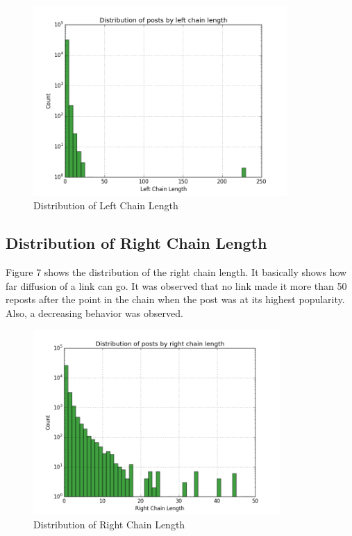 \documentclass{article} %
\begin{document}
\begin{figure}[h]
\begin{center}
\includegraphics[width=3.8in]{left_chain.png}
\caption{Distribution of Left Chain Length}
\end{center}
\end{figure}

\subsection{Distribution of Right Chain Length}

Figure 7 shows the distribution of the right chain length. It basically shows how far diffusion of a link can go. It was observed that no link made it more than 50 reposts after the point in the chain when the post was at its highest popularity. Also, a decreasing behavior was observed. 

\begin{figure}[h]
\begin{center}
\includegraphics[width=3.7in]{right_chain.png}
\caption{Distribution of Right Chain Length}
\end{center}
\end{figure}
\end{document}
